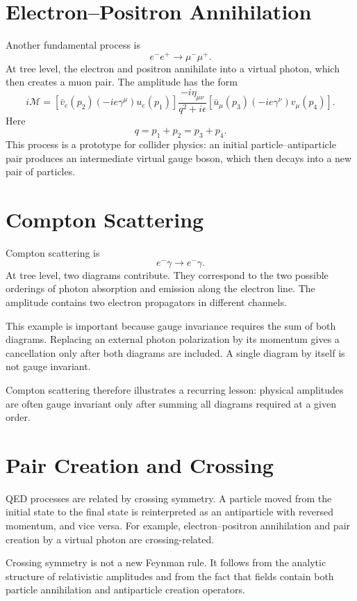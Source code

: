 \section{Electron--Positron Annihilation}

Another fundamental process is
\[
    e^-e^+\longrightarrow \mu^-\mu^+.
\]
At tree level, the electron and positron annihilate into a virtual photon, which
then creates a muon pair. The amplitude has the form
\[
    i\mathcal{M}
    = [\bar v_e(p_2)(-ie\gamma^\mu)u_e(p_1)]
      \frac{-i\eta_{\mu\nu}}{q^2+i\epsilon}
      [\bar u_\mu(p_3)(-ie\gamma^\nu)v_\mu(p_4)].
\]
Here
\[
    q=p_1+p_2=p_3+p_4.
\]
This process is a prototype for collider physics: an initial particle--antiparticle
pair produces an intermediate virtual gauge boson, which then decays into a new
pair of particles.

\section{Compton Scattering}

Compton scattering is
\[
    e^-\gamma\longrightarrow e^-\gamma.
\]
At tree level, two diagrams contribute. They correspond to the two possible
orderings of photon absorption and emission along the electron line. The amplitude
contains two electron propagators in different channels.

This example is important because gauge invariance requires the sum of both
diagrams. Replacing an external photon polarization by its momentum gives a
cancellation only after both diagrams are included. A single diagram by itself is
not gauge invariant.

Compton scattering therefore illustrates a recurring lesson: physical amplitudes
are often gauge invariant only after summing all diagrams required at a given
order.

\section{Pair Creation and Crossing}

QED processes are related by crossing symmetry. A particle moved from the initial
state to the final state is reinterpreted as an antiparticle with reversed
momentum, and vice versa. For example, electron--positron annihilation and pair
creation by a virtual photon are crossing-related.

Crossing symmetry is not a new Feynman rule. It follows from the analytic
structure of relativistic amplitudes and from the fact that fields contain both
particle annihilation and antiparticle creation operators.


